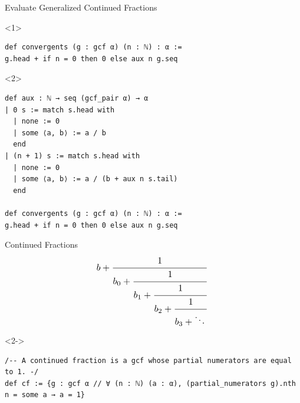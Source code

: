 \documentclass{beamer}
\begin{document}
\begin{frame}[fragile]{Evaluate Generalized Continued Fractions}
\begin{onlyenv}<1>
\begin{verbatim}
def convergents (g : gcf α) (n : ℕ) : α :=
g.head + if n = 0 then 0 else aux n g.seq
\end{verbatim}
\end{onlyenv}
\begin{onlyenv}<2>
\begin{verbatim}
def aux : ℕ → seq (gcf_pair α) → α
| 0 s := match s.head with
  | none := 0
  | some ⟨a, b⟩ := a / b
  end
| (n + 1) s := match s.head with
  | none := 0
  | some ⟨a, b⟩ := a / (b + aux n s.tail)
  end

def convergents (g : gcf α) (n : ℕ) : α :=
g.head + if n = 0 then 0 else aux n g.seq
\end{verbatim}
\end{onlyenv}

\end{frame}
\begin{frame}[fragile]{Continued Fractions}
\begin{equation*}
\resizebox{0.4\hsize}{!}{$
b + \cfrac{1}{b_0 + \cfrac{1}{b_1 + \cfrac{1}{b_2 + \cfrac{1}{b_3 + \ddots\,}}}}$
}
\end{equation*}
\pause
\vspace{-5mm}
\begin{visibleenv}<2->
\begin{verbatim}
/-- A continued fraction is a gcf whose partial numerators are equal to 1. -/
def cf := {g : gcf α // ∀ (n : ℕ) (a : α), (partial_numerators g).nth n = some a → a = 1}
\end{verbatim}
\end{visibleenv}
\end{frame}
\end{document}
